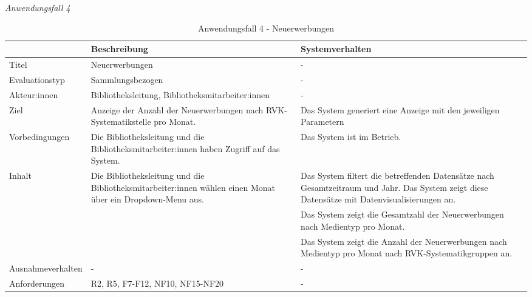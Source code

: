 \newpage
\noindent
\textit{Anwendungsfall 4}

\begingroup
\setlength{\tabcolsep}{10pt} %
\renewcommand{\arraystretch}{1.25} 
\begin{table}[h]
    \centering
    \begin{adjustbox}{max width=\textwidth}
    \begin{tabular}{lp{7.0cm}p{7.0cm}}
       \toprule
       \textbf{}          & \textbf{Beschreibung} &\textbf{Systemverhalten}\\
       \midrule
        Titel                            &Neuerwerbungen& -\\
        Evaluationstyp                   &Sammlungsbezogen                   & -\\
        Akteur:innen                     &Bibliotheksleitung, Bibliotheksmitarbeiter:innen& -\\
        Ziel                             &Anzeige der Anzahl der Neuerwerbungen nach RVK-Systematikstelle pro Monat.& Das System generiert eine Anzeige mit den jeweiligen Parametern\\
        Vorbedingungen                   &Die Bibliotheksleitung und die Bibliotheksmitarbeiter:innen haben Zugriff auf das System.& Das System ist im Betrieb.\\
        Inhalt                &Die Bibliotheksleitung und die Bibliotheksmitarbeiter:innen wählen einen Monat über ein Dropdown-Menu aus.& Das System filtert die betreffenden Datensätze nach Gesamtzeitraum und Jahr. Das System zeigt diese Datensätze mit Datenvisualisierungen an.\\
                                         & &Das System zeigt die Gesamtzahl der Neuerwerbungen nach Medientyp pro Monat.\\
                                         & &Das System zeigt die Anzahl der Neuerwerbungen nach Medientyp pro Monat nach RVK-Systematikgruppen an.\\
        Ausnahmeverhalten               &- & -\\

        Anforderungen                   &R2, R5, F7-F12, NF10, NF15-NF20& -\\
        \bottomrule
    \end{tabular}
    \end{adjustbox}
    \caption{%
    Anwendungsfall 4 - Neuerwerbungen    }
    \label{tab:AF_Neuerwerbungen}
    \end{table}
\endgroup


